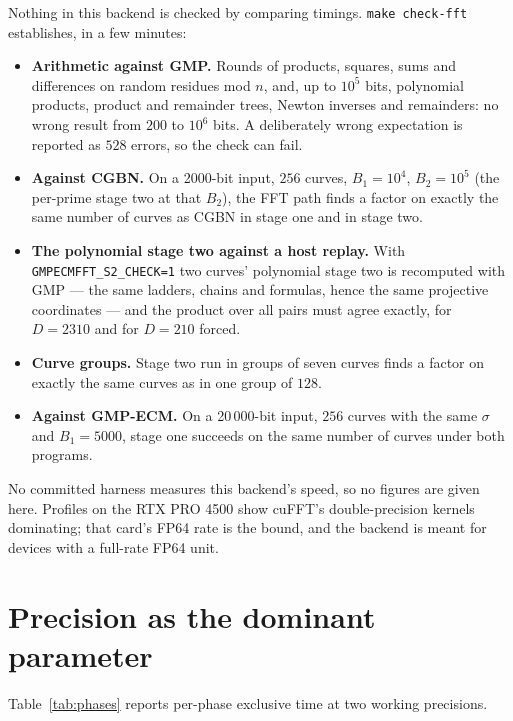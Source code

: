 \documentclass[11pt,a4paper]{article}
\newcommand{\code}[1]{\texttt{#1}}
\begin{document}
Nothing in this backend is checked by comparing timings. \code{make check-fft} establishes,
in a few minutes:
\begin{itemize}
  \item \textbf{Arithmetic against GMP.} Rounds of products, squares, sums and differences on
    random residues mod $n$, and, up to $10^5$ bits, polynomial products, product and remainder
    trees, Newton inverses and remainders: no wrong result from $200$ to $10^6$ bits. A
    deliberately wrong expectation is reported as $528$ errors, so the check can fail.
  \item \textbf{Against CGBN.} On a 2000-bit input, $256$ curves, $B_1 = 10^4$, $B_2 = 10^5$
    (the per-prime stage two at that $B_2$), the FFT path finds a factor on exactly the same
    number of curves as CGBN in stage one and in stage two.
  \item \textbf{The polynomial stage two against a host replay.} With
    \code{GMPECMFFT\_S2\_CHECK=1} two curves' polynomial stage two is recomputed with GMP ---
    the same ladders, chains and formulas, hence the same projective coordinates --- and the
    product over all pairs must agree exactly, for $D = 2310$ and for $D = 210$ forced.
  \item \textbf{Curve groups.} Stage two run in groups of seven curves finds a factor on
    exactly the same curves as in one group of $128$.
  \item \textbf{Against GMP-ECM.} On a 20\,000-bit input, $256$ curves with the same
    $\sigma$ and $B_1 = 5000$, stage one succeeds on the same number of curves under both
    programs.
\end{itemize}

No committed harness measures this backend's speed, so no figures are given here. Profiles on
the RTX PRO 4500 show cuFFT's double-precision kernels dominating; that card's FP64 rate is the
bound, and the backend is meant for devices with a full-rate FP64 unit.

\section{Precision as the dominant parameter}

Table~\ref{tab:phases} reports per-phase exclusive time at two working
precisions.
\end{document}
